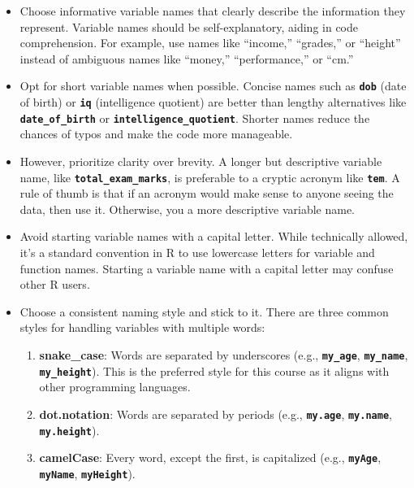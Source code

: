\documentclass[
]{book}
\begin{document}
\begin{itemize}
\item
  Choose informative variable names that clearly describe the information they represent. Variable names should be self-explanatory, aiding in code comprehension. For example, use names like ``income,'' ``grades,'' or ``height'' instead of ambiguous names like ``money,'' ``performance,'' or ``cm.''
\item
  Opt for short variable names when possible. Concise names such as \textbf{\texttt{dob}} (date of birth) or \textbf{\texttt{iq}} (intelligence quotient) are better than lengthy alternatives like \textbf{\texttt{date\_of\_birth}} or \textbf{\texttt{intelligence\_quotient}}. Shorter names reduce the chances of typos and make the code more manageable.
\item
  However, prioritize clarity over brevity. A longer but descriptive variable name, like \textbf{\texttt{total\_exam\_marks}}, is preferable to a cryptic acronym like \textbf{\texttt{tem}}. A rule of thumb is that if an acronym would make sense to anyone seeing the data, then use it. Otherwise, you a more descriptive variable name.
\item
  Avoid starting variable names with a capital letter. While technically allowed, it's a standard convention in R to use lowercase letters for variable and function names. Starting a variable name with a capital letter may confuse other R users.
\item
  Choose a consistent naming style and stick to it. There are three common styles for handling variables with multiple words:

  \begin{enumerate}
  \def\labelenumi{\arabic{enumi}.}
  \item
    \textbf{snake\_case}: Words are separated by underscores (e.g., \textbf{\texttt{my\_age}}, \textbf{\texttt{my\_name}}, \textbf{\texttt{my\_height}}). This is the preferred style for this course as it aligns with other programming languages.
  \item
    \textbf{dot.notation}: Words are separated by periods (e.g., \textbf{\texttt{my.age}}, \textbf{\texttt{my.name}}, \textbf{\texttt{my.height}}).
  \item
    \textbf{camelCase}: Every word, except the first, is capitalized (e.g., \textbf{\texttt{myAge}}, \textbf{\texttt{myName}}, \textbf{\texttt{myHeight}}).
  \end{enumerate}
\end{itemize}
\end{document}
